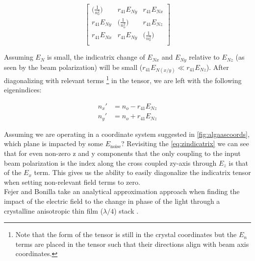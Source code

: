 \begin{equation}
 \left[ {\begin{array}{ccc}
   \big( \frac{1}{n_o ^2} \big)& r_{41}E_{Ny} & r_{41} E_{Nx}\\
   r_{41}E_{Ny} & \big( \frac{1}{n_o ^2} \big) & r_{41} E_{Nz}\\
   r_{41} E_{Nx} & r_{41} E_{Ny} & \big( \frac{1}{n_o ^2} \big)\\
  \end{array}} \right]
\end{equation}

\noindent Assuming $E_N$ is small, the indicatrix change of $E_{Nx}$ and $E_{Ny}$ relative to $E_{Nz}$ (as seen by the beam polarization) will be small ($r_{41}E_{N(x/y)} \ll r_{41}E_{Nz}$). After diagonalizing with relevant terms \footnote{Note that the form of the tensor is still in the crystal coordinates but the $E_n$ terms are placed in the tensor such that their directions align with beam axis coordinates.} in the tensor, we are left with the following eigenindices:

\begin{equation}
\begin{aligned}
n_x' & = n_o - r_{41}E_{Nz} \\
n_y' & = n_o + r_{41}E_{Nz}
\end{aligned}
\end{equation}


\noindent Assuming we are operating in a coordinate system suggested in \autoref{fig:algaascoords}, which plane is impacted by some $E_\mathrm{noise}$? Revisiting the \autoref{eq:zindicatrix} we can see that for even non-zero z and y components that the only coupling to the input beam polarization is the index along the cross coupled zy-axis through $E_z$ is that of the $E_x$ term. This gives us the ability to easily diagonalize the indicatrix tensor when setting non-relevant field terms to zero.
\\
Fejer and Bonilla take an analytical approximation approach when finding the impact of the electric field to the change in phase of the light through a crystalline anisotropic thin film ($\lambda/4$) stack \cite{bonillafejer}.

